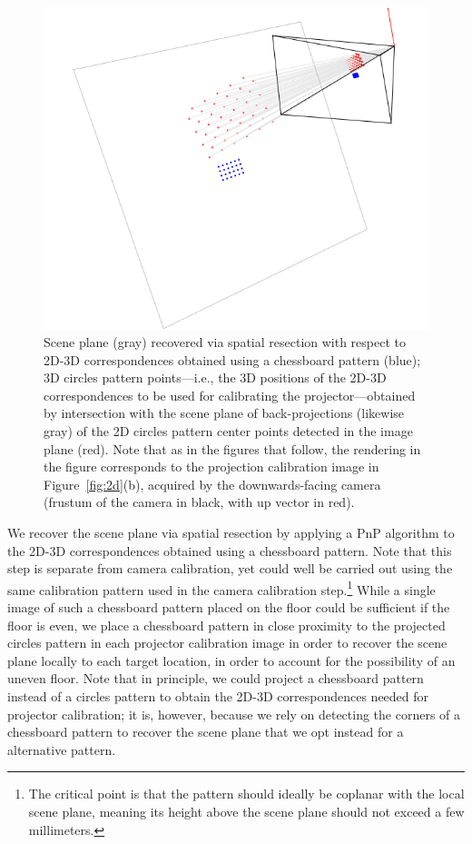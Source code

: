 \documentclass[review]{elsarticle}
\begin{document}
\begin{figure}
    \centerline{\includegraphics[scale=.35]{images/2d3d.png}}
    \caption{Scene plane (gray) recovered via spatial resection with respect to 2D-3D correspondences obtained using a chessboard pattern (blue); 3D circles pattern points---i.e., the 3D positions of the
2D-3D correspondences to be used for calibrating the projector---obtained by intersection with the scene plane of back-projections (likewise gray) of the 2D circles pattern center points detected in the image plane (red). Note that as in the figures that follow, the rendering in the figure corresponds to the projection calibration image in Figure~\ref{fig:2d}(b), acquired by the downwards-facing camera (frustum of the camera in black, with up vector in red).}
    \label{fig:3d}
\end{figure}

We recover the scene plane via spatial resection by applying a PnP algorithm \cite{collins2014infinitesimal} to the 2D-3D correspondences obtained using a chessboard pattern. Note that this step is separate from camera calibration, yet could well be carried out using the same calibration pattern used in the camera calibration step.\footnote{The critical point is that the pattern should ideally be coplanar with the local scene plane, meaning its height above the scene plane should not exceed a few millimeters.} While a single image of such a chessboard pattern placed on the floor could be sufficient if the floor is even, we place a chessboard pattern in close proximity to the projected circles pattern in each projector calibration image in order to recover the scene plane locally to each target location, in order to account for the possibility of an uneven floor. Note that in principle, we could project a chessboard pattern instead of a circles pattern to obtain the 2D-3D correspondences needed for projector calibration; it is, however, because we rely on detecting the corners of a chessboard pattern to recover the scene plane that we opt instead for a alternative pattern.
\end{document}
